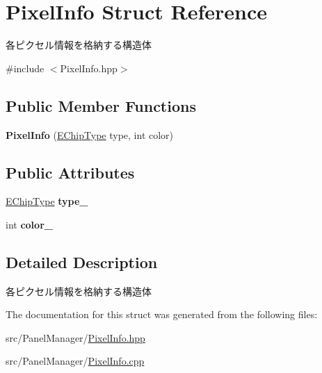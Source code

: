 \hypertarget{structPixelInfo}{}\section{Pixel\+Info Struct Reference}
\label{structPixelInfo}


各ピクセル情報を格納する構造体  




{\ttfamily \#include $<$Pixel\+Info.\+hpp$>$}

\subsection*{Public Member Functions}
\begin{DoxyCompactItemize}
\item 
\mbox{\label{structPixelInfo_a1cfb39b0dd82a5bac358b0d7f2a6cc37}} 
{\bfseries Pixel\+Info} (\hyperlink{PixelInfo_8hpp_a045ad070577d6987c818af7bc910ae1a}{E\+Chip\+Type} type, int color)
\end{DoxyCompactItemize}
\subsection*{Public Attributes}
\begin{DoxyCompactItemize}
\item 
\mbox{\label{structPixelInfo_a3591ab17d9760da336e281c1e37682be}} 
\hyperlink{PixelInfo_8hpp_a045ad070577d6987c818af7bc910ae1a}{E\+Chip\+Type} {\bfseries type\+\_\+}
\item 
\mbox{\label{structPixelInfo_ac211b0b05b1e918bba9fdff7c09a347a}} 
int {\bfseries color\+\_\+}
\end{DoxyCompactItemize}


\subsection{Detailed Description}
各ピクセル情報を格納する構造体 

The documentation for this struct was generated from the following files\+:\begin{DoxyCompactItemize}
\item 
src/\+Panel\+Manager/\hyperlink{PixelInfo_8hpp}{Pixel\+Info.\+hpp}\item 
src/\+Panel\+Manager/\hyperlink{PixelInfo_8cpp}{Pixel\+Info.\+cpp}\end{DoxyCompactItemize}
